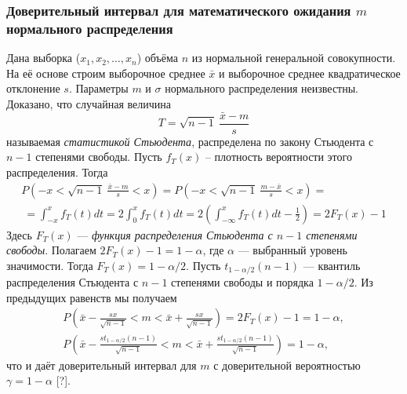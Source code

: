 \documentclass[main.tex]{subfiles}
\begin{document}
\subsubsection{Доверительный интервал для математического ожидания $m$ нормального распределения}
Дана выборка ($x_{1}, x_{2}, \dots, x_{n}$) объёма $n$ из нормальной генеральной совокупности. На её основе строим выборочное среднее $\bar{x}$ и выборочное среднее квадратическое отклонение $s$. Параметры $m$ и $\sigma$ нормального распределения неизвестны.
\newline
Доказано, что случайная величина
\begin{equation}
	T = \sqrt{n - 1} \ \frac{\bar{x} - m}{s}
	\label{eq:T}
\end{equation}
называемая \textit{статистикой Стьюдента}, распределена по закону Стьюдента с $n-1$ степенями свободы. Пусть $f_{T}(x)$ -- плотность вероятности этого распределения. Тогда 
\begin{multline}
	P\left(-x < \sqrt{n - 1} \ \frac{\bar{x} - m}{s} < x \right) = 
	P\left(-x < \sqrt{n - 1} \ \frac{m - \bar{x}}{s} < x \right) = \\\
	= \int_{-x}^{x}{f_{T}(t)d t} = 2 \int_{0}^{x}{f_{T}(t)d t} = 
	2\left(  \int_{-\infty}^{x}{f_{T}(t)d t} - \frac{1}{2} \right) = 2F_{T}(x) - 1
	\label{eq:P_f_t}
\end{multline}
Здесь $F_{T}(x)$ — \textit{функция распределения Стьюдента с $n-1$ степенями свободы}.
\newline
Полагаем $2F_{T}(x)-1 = 1-\alpha$, где $\alpha$ — выбранный уровень значимости. Тогда $F_{T}(x) = 1-\alpha/2$. Пусть $t_{1-\alpha/2} (n-1)$ — квантиль распределения Стьюдента с $n-1$ степенями свободы и порядка $1-\alpha/2$. Из предыдущих равенств мы получаем 
\begin{equation}
	\begin{split}
		P\left(\bar{x} - \frac{sx}{\sqrt{n-1}} < m <  \bar{x} + \frac{sx}{\sqrt{n-1}}\right) = 2F_{T}(x) - 1 = 1 - \alpha,  \\
		P\left(\bar{x} - \frac{s t_{1-\alpha/2} (n-1)}{\sqrt{n-1}} < m <  \bar{x} + \frac{s t_{1-\alpha/2} (n-1)}{\sqrt{n-1}}\right)= 1 - \alpha, 
		\label{eq:P_m}     
	\end{split}
\end{equation}
что и даёт доверительный интервал для $m$ с доверительной вероятностью $\gamma = 1-\alpha$ [?].
\end{document}
